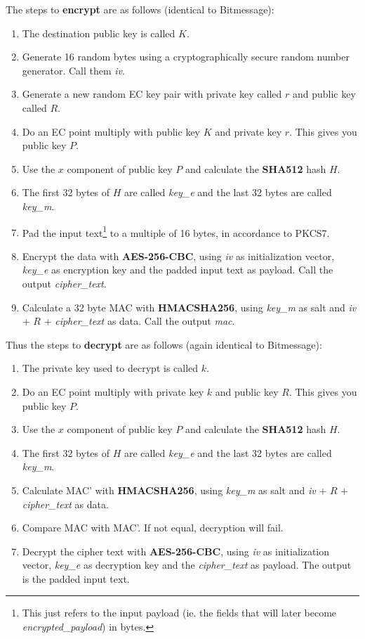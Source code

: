 \documentclass{article}
\begin{document}
\hspace{-\parindent}The steps to \textbf{encrypt} are as follows (identical to Bitmessage\cite{bitmessage_ecies}):
\begin{enumerate}
    \item The destination public key is called $K$.
    \item Generate 16 random bytes using a cryptographically secure random number generator. Call them \textit{iv}.
    \item Generate a new random EC key pair with private key called $r$ and public key called $R$.
    \item Do an EC point multiply with public key $K$ and private key $r$. This gives you public key $P$.
    \item Use the $x$ component of public key $P$ and calculate the \textbf{SHA512} hash $H$.
    \item The first 32 bytes of $H$ are called \textit{key\_e} and the last 32 bytes are called \textit{key\_m}.
    \item Pad the input text\footnote{This just refers to the input payload (ie. the fields that will later become \textit{encrypted\_payload}) in bytes.} to a multiple of 16 bytes, in accordance to PKCS7\cite{pkcs7}.
    \item Encrypt the data with \textbf{AES-256-CBC}, using \textit{iv} as initialization vector, \textit{key\_e} as encryption key and the padded input text as payload. Call the output \textit{cipher\_text}.
    \item Calculate a 32 byte MAC with \textbf{HMACSHA256}, using \textit{key\_m} as salt and \textit{iv} + $R$ + \textit{cipher\_text} as data. Call the output \textit{mac}.
\end{enumerate}
Thus the steps to \textbf{decrypt} are as follows (again identical to Bitmessage):
\begin{enumerate}
    \item The private key used to decrypt is called $k$.
    \item Do an EC point multiply with private key $k$ and public key $R$. This gives you public key $P$.
    \item Use the $x$ component of public key $P$ and calculate the \textbf{SHA512} hash $H$.
    \item The first 32 bytes of $H$ are called \textit{key\_e} and the last 32 bytes are called \textit{key\_m}.
    \item Calculate MAC' with \textbf{HMACSHA256}, using \textit{key\_m} as salt and \textit{iv} + $R$ + \textit{cipher\_text} as data.
    \item Compare MAC with MAC'. If not equal, decryption will fail.
    \item Decrypt the cipher text with \textbf{AES-256-CBC}, using \textit{iv} as initialization vector, \textit{key\_e} as decryption key and the \textit{cipher\_text} as payload. The output is the padded input text.
\end{enumerate}
\end{document}
